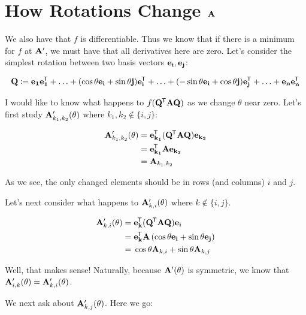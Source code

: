 \documentclass[11pt, oneside]{amsart}
\begin{document}
\section{How Rotations Change $\mathbf{A}$}

We also have that $f$ is differentiable. Thus we know that if there is a
minimum for $f$ at $\mathbf{A}'$, we must have that all derivatives here are
zero. Let's consider the simplest rotation between two basis vectors
$\mathbf{e}_{\mathbf{i}}, \mathbf{e}_{\mathbf{j}}$:

\[
  \mathbf{Q} \coloneqq
    \mathbf{e}_{\mathbf{1}}\mathbf{e}_{\mathbf{1}}^{\mkern-1.5mu\mathsf{T}}
    + \ldots + (\cos\theta \mathbf{e}_{\mathbf{i}} + \sin\theta \mathbf{j}) \mathbf{e}_{\mathbf{i}}^{\mkern-1.5mu\mathsf{T}}
    + \ldots + (-\sin\theta \mathbf{e}_{\mathbf{i}} + \cos\theta \mathbf{j}) \mathbf{e}_{\mathbf{j}}^{\mkern-1.5mu\mathsf{T}}
    + \ldots + \mathbf{e}_{\mathbf{n}}\mathbf{e}_{\mathbf{n}}^{\mkern-1.5mu\mathsf{T}}
\]

I would like to know what happens to $f(\mathbf{Q}^{\mkern-1.5mu\mathsf{T}} \mathbf{A} \mathbf{Q})$ as we
change $\theta$ near zero. Let's first study $\mathbf{A}'_{k_1, k_2}(\theta)$
where $k_1, k_2 \not\in \{ i, j \}$:

\begin{equation*}
  \begin{split}
    \mathbf{A}'_{k_1, k_2}(\theta)
      ={}& \mathbf{e}_{\mathbf{k_1}}^{\mkern-1.5mu\mathsf{T}} (\mathbf{Q}^{\mkern-1.5mu\mathsf{T}} \mathbf{A} \mathbf{Q}) \mathbf{e}_{\mathbf{k_2}} \\
      ={}& \mathbf{e}_{\mathbf{k_1}}^{\mkern-1.5mu\mathsf{T}} \mathbf{A} \mathbf{e}_{\mathbf{k_2}} \\
      ={}& \mathbf{A}_{k_1, k_2}
  \end{split}
\end{equation*}

As we see, the only changed elements should be in rows (and columns) $i$
and $j$.

Let's next consider what happens to $\mathbf{A}'_{k, i}(\theta)$ where $k
\not\in \{i, j\}$.

\begin{equation*}
  \begin{split}
    \mathbf{A}'_{k, i}(\theta)
      ={}& \mathbf{e}_{\mathbf{k}}^{\mkern-1.5mu\mathsf{T}} (\mathbf{Q}^{\mkern-1.5mu\mathsf{T}} \mathbf{A} \mathbf{Q}) \mathbf{e}_{\mathbf{i}} \\
      ={}& \mathbf{e}_{\mathbf{k}}^{\mkern-1.5mu\mathsf{T}} \mathbf{A} \left(
        \cos\theta \mathbf{e}_{\mathbf{i}} + \sin\theta \mathbf{e}_{\mathbf{j}}
      \right) \\
      ={}& \cos\theta \mathbf{A}_{k, i} + \sin\theta \mathbf{A}_{k, j}
  \end{split}
\end{equation*}

Well, that makes sense! Naturally, because $\mathbf{A}'(\theta)$ is
symmetric, we know that $\mathbf{A}'_{i, k}(\theta) = \mathbf{A}'_{k, i}(\theta)$.

We next ask about $\mathbf{A}'_{k, j}(\theta)$. Here we go:
\end{document}
